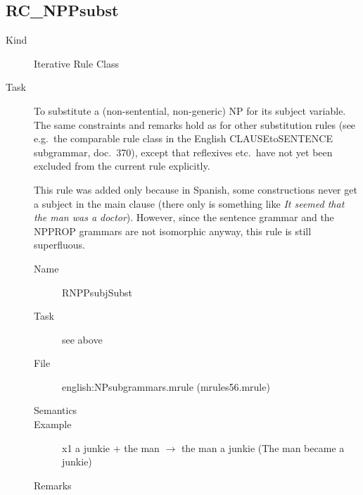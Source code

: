 \subsection{RC\_NPPsubst}
\begin{description}
\item[Kind] Iterative Rule Class
\item[Task] To substitute a (non-sentential, non-generic) NP for its subject 
variable. The same constraints and remarks hold as for other substitution rules 
(see e.g.\ the comparable rule class in the English CLAUSEtoSENTENCE 
subgrammar, doc.\ 
370), except that reflexives etc.\ have not yet been excluded from the 
current rule explicitly. 

This rule was added only because in Spanish, some constructions never get a 
subject in the main clause (there only is something like {\em It seemed that 
the man was a doctor\/}). However, since the sentence grammar and the NPPROP 
grammars are not isomorphic anyway, this rule is still superfluous.

\vspace{1 cm}
\begin{description}
\item[Name] RNPPsubjSubst
\item[Task] see above
\item[File] english:NPsubgrammars.mrule (mrules56.mrule)
\item[Semantics]
\item[Example] x1 a junkie + the man $\rightarrow$ the man a junkie (The man 
became a junkie)
\item[Remarks]
\end{description}

\end{description}

\newpage
